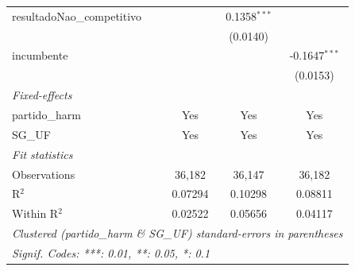 \begin{tabular}{lccc}
   resultadoNao\_competitivo                 &                 & 0.1358$^{***}$  &   \\   
                                             &                 & (0.0140)        &   \\   
   incumbente                                &                 &                 & -0.1647$^{***}$\\   
                                             &                 &                 & (0.0153)\\   
   \midrule
   \emph{Fixed-effects}\\
   partido\_harm                             & Yes             & Yes             & Yes\\  
   SG\_UF                                    & Yes             & Yes             & Yes\\  
   \midrule
   \emph{Fit statistics}\\
   Observations                              & 36,182          & 36,147          & 36,182\\  
   R$^2$                                     & 0.07294         & 0.10298         & 0.08811\\  
   Within R$^2$                              & 0.02522         & 0.05656         & 0.04117\\  
   \midrule \midrule
   \multicolumn{4}{l}{\emph{Clustered (partido\_harm \& SG\_UF) standard-errors in parentheses}}\\
   \multicolumn{4}{l}{\emph{Signif. Codes: ***: 0.01, **: 0.05, *: 0.1}}\\
\end{tabular}
\par\endgroup


